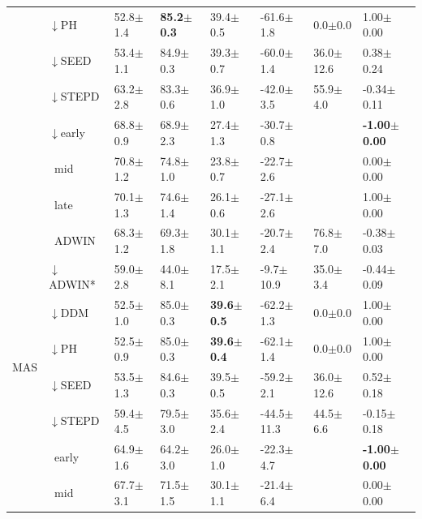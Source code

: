 \begin{tabular}{llllllll}
 & $\downarrow$PH & 52.8\tiny{$\pm$1.4} & \textbf{85.2\tiny{$\pm$0.3}} & 39.4\tiny{$\pm$0.5} & -61.6\tiny{$\pm$1.8} & 0.0\tiny{$\pm$0.0} & 1.00\tiny{$\pm$0.00} \\
 & $\downarrow$SEED & 53.4\tiny{$\pm$1.1} & 84.9\tiny{$\pm$0.3} & 39.3\tiny{$\pm$0.7} & -60.0\tiny{$\pm$1.4} & 36.0\tiny{$\pm$12.6} & 0.38\tiny{$\pm$0.24} \\
 & $\downarrow$STEPD & 63.2\tiny{$\pm$2.8} & 83.3\tiny{$\pm$0.6} & 36.9\tiny{$\pm$1.0} & -42.0\tiny{$\pm$3.5} & 55.9\tiny{$\pm$4.0} & -0.34\tiny{$\pm$0.11} \\
 & $\downarrow$early & 68.8\tiny{$\pm$0.9} & 68.9\tiny{$\pm$2.3} & 27.4\tiny{$\pm$1.3} & -30.7\tiny{$\pm$0.8} &  & \textbf{-1.00\tiny{$\pm$0.00}} \\
 & $\ \;$mid & 70.8\tiny{$\pm$1.2} & 74.8\tiny{$\pm$1.0} & 23.8\tiny{$\pm$0.7} & -22.7\tiny{$\pm$2.6} &  & 0.00\tiny{$\pm$0.00} \\
 & $\ \;$late & 70.1\tiny{$\pm$1.3} & 74.6\tiny{$\pm$1.4} & 26.1\tiny{$\pm$0.6} & -27.1\tiny{$\pm$2.6} &  & 1.00\tiny{$\pm$0.00} \\
\midrule
\multirow[t]{9}{*}{MAS} & $\ \;$ADWIN & 68.3\tiny{$\pm$1.2} & 69.3\tiny{$\pm$1.8} & 30.1\tiny{$\pm$1.1} & -20.7\tiny{$\pm$2.4} & 76.8\tiny{$\pm$7.0} & -0.38\tiny{$\pm$0.03} \\
 & $\downarrow$ADWIN* & 59.0\tiny{$\pm$2.8} & 44.0\tiny{$\pm$8.1} & 17.5\tiny{$\pm$2.1} & -9.7\tiny{$\pm$10.9} & 35.0\tiny{$\pm$3.4} & -0.44\tiny{$\pm$0.09} \\
 & $\downarrow$DDM & 52.5\tiny{$\pm$1.0} & 85.0\tiny{$\pm$0.3} & \textbf{39.6\tiny{$\pm$0.5}} & -62.2\tiny{$\pm$1.3} & 0.0\tiny{$\pm$0.0} & 1.00\tiny{$\pm$0.00} \\
 & $\downarrow$PH & 52.5\tiny{$\pm$0.9} & 85.0\tiny{$\pm$0.3} & \textbf{39.6\tiny{$\pm$0.4}} & -62.1\tiny{$\pm$1.4} & 0.0\tiny{$\pm$0.0} & 1.00\tiny{$\pm$0.00} \\
 & $\downarrow$SEED & 53.5\tiny{$\pm$1.3} & 84.6\tiny{$\pm$0.3} & 39.5\tiny{$\pm$0.5} & -59.2\tiny{$\pm$2.1} & 36.0\tiny{$\pm$12.6} & 0.52\tiny{$\pm$0.18} \\
 & $\downarrow$STEPD & 59.4\tiny{$\pm$4.5} & 79.5\tiny{$\pm$3.0} & 35.6\tiny{$\pm$2.4} & -44.5\tiny{$\pm$11.3} & 44.5\tiny{$\pm$6.6} & -0.15\tiny{$\pm$0.18} \\
 & $\ \;$early & 64.9\tiny{$\pm$1.6} & 64.2\tiny{$\pm$3.0} & 26.0\tiny{$\pm$1.0} & -22.3\tiny{$\pm$4.7} &  & \textbf{-1.00\tiny{$\pm$0.00}} \\
 & $\ \;$mid & 67.7\tiny{$\pm$3.1} & 71.5\tiny{$\pm$1.5} & 30.1\tiny{$\pm$1.1} & -21.4\tiny{$\pm$6.4} &  & 0.00\tiny{$\pm$0.00} \\

\end{tabular}
